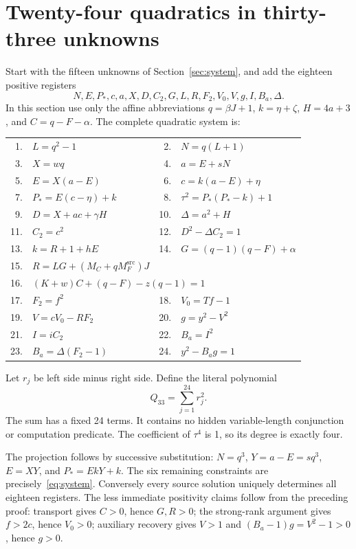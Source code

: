 \documentclass[11pt,a4paper]{article}
\theoremstyle{remark}\newtheorem{remark}[theorem]{Remark}
\newcommand{\Msrc}{M_F^{\mathrm{src}}}
\begin{document}
\section{Twenty-four quadratics in thirty-three unknowns}\label{sec:quadratic}
Start with the fifteen unknowns of Section~\ref{sec:system}, and add
the eighteen positive registers
\[
 N,E,P_*,c,a,X,D,C_2,G,L,R,F_2,V_0,V,g,I,B_a,\Delta.
\]
In this section use only the affine abbreviations
\(q=\beta J+1\), \(k=\eta+\zeta\), \(H=4a+3\),
and \(C=q-F-\alpha\). The complete quadratic system is:
\begin{center}\small
\begin{longtable}{rl@{\qquad}rl}
\toprule
1.&\(L=q^2-1\)&2.&\(N=q(L+1)\)\\
3.&\(X=wq\)&4.&\(a=E+sN\)\\
5.&\(E=X(a-E)\)&6.&\(c=k(a-E)+\eta\)\\
7.&\(P_*=E(c-\eta)+k\)&8.&\(\tau^2=P_*(P_*-k)+1\)\\
9.&\(D=X+ac+\gamma H\)&10.&\(\Delta=a^2+H\)\\
11.&\(C_2=c^2\)&12.&\(D^2-\Delta C_2=1\)\\
13.&\(k=R+1+hE\)&14.&\(G=(q-1)(q-F)+\alpha\)\\
15.&\(R=LG+(M_C+q\Msrc)J\)&&\\
16.&\multicolumn{3}{l}{\((K+w)C+(q-F)-z(q-1)=1\)}\\
17.&\(F_2=f^2\)&18.&\(V_0=Tf-1\)\\
19.&\(V=cV_0-RF_2\)&20.&\(g=y^2-V^2\)\\
21.&\(I=iC_2\)&22.&\(B_a=I^2\)\\
23.&\(B_a=\Delta(F_2-1)\)&24.&\(y^2-B_ag=1\)\\
\bottomrule
\end{longtable}
\end{center}
Let \(r_j\) be left side minus right side. Define the literal polynomial
\begin{equation}
 \boxed{Q_{33}=\sum_{j=1}^{24}r_j^2.}\label{eq:q33}
\end{equation}
The sum has a fixed 24 terms. It contains no hidden variable-length
conjunction or computation predicate. The coefficient of \(\tau^4\)
is 1, so its degree is exactly four.

The projection follows by successive substitution: \(N=q^3\),
\(Y=a-E=sq^3\), \(E=XY\), and \(P_*=EkY+k\). The six
remaining constraints are precisely~\eqref{eq:system}. Conversely
every source solution uniquely determines all eighteen registers.
The less immediate positivity claims follow from the preceding proof:
transport gives \(C>0\), hence \(G,R>0\); the strong-rank argument
gives \(f>2c\), hence \(V_0>0\); auxiliary recovery gives \(V>1\)
and \((B_a-1)g=V^2-1>0\), hence \(g>0\).
\end{document}
